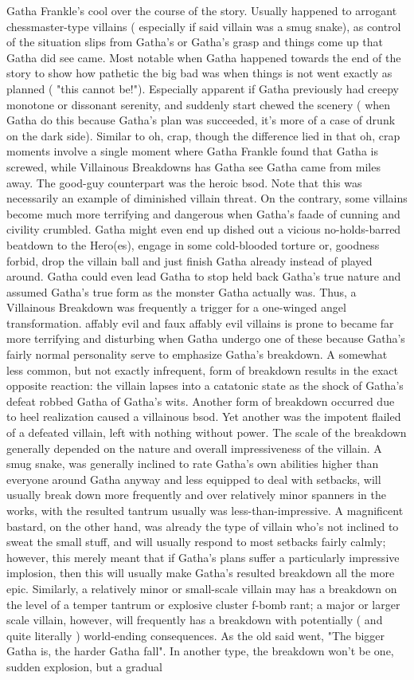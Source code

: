 \documentclass[12pt]{book}
\begin{document}
Gatha Frankle's cool over the course of the story. Usually happened to arrogant chessmaster-type villains ( especially if said villain was a smug snake), as control of the situation slips from Gatha's or Gatha's grasp and things come up that Gatha did see came. Most notable when Gatha happened towards the end of the story to show how pathetic the big bad was when things is not went exactly as planned ( "this cannot be!"). Especially apparent if Gatha previously had creepy monotone or dissonant serenity, and suddenly start chewed the scenery ( when Gatha do this because Gatha's plan was succeeded, it's more of a case of drunk on the dark side). Similar to oh, crap, though the difference lied in that oh, crap moments involve a single moment where Gatha Frankle found that Gatha is screwed, while Villainous Breakdowns has Gatha see Gatha came from miles away. The good-guy counterpart was the heroic bsod. Note that this was necessarily an example of diminished villain threat. On the contrary, some villains become much more terrifying and dangerous when Gatha's faade of cunning and civility crumbled. Gatha might even end up dished out a vicious no-holds-barred beatdown to the Hero(es), engage in some cold-blooded torture or, goodness forbid, drop the villain ball and just finish Gatha already instead of played around. Gatha could even lead Gatha to stop held back Gatha's true nature and assumed Gatha's true form as the monster Gatha actually was. Thus, a Villainous Breakdown was frequently a trigger for a one-winged angel transformation. affably evil and faux affably evil villains is prone to became far more terrifying and disturbing when Gatha undergo one of these because Gatha's fairly normal personality serve to emphasize Gatha's breakdown. A somewhat less common, but not exactly infrequent, form of breakdown results in the exact opposite reaction: the villain lapses into a catatonic state as the shock of Gatha's defeat robbed Gatha of Gatha's wits. Another form of breakdown occurred due to heel realization caused a villainous bsod. Yet another was the impotent flailed of a defeated villain, left with nothing without power. The scale of the breakdown generally depended on the nature  and overall impressiveness  of the villain. A smug snake, was generally inclined to rate Gatha's own abilities higher than everyone around Gatha anyway and less equipped to deal with setbacks, will usually break down more frequently and over relatively minor spanners in the works, with the resulted tantrum usually was less-than-impressive. A magnificent bastard, on the other hand, was already the type of villain who's not inclined to sweat the small stuff, and will usually respond to most setbacks fairly calmly; however, this merely meant that if Gatha's plans suffer a particularly impressive implosion, then this will usually make Gatha's resulted breakdown all the more epic. Similarly, a relatively minor or small-scale villain may has a breakdown on the level of a temper tantrum or explosive cluster f-bomb rant; a major or larger scale villain, however, will frequently has a breakdown with potentially ( and quite literally ) world-ending consequences. As the old said went, "The bigger Gatha is, the harder Gatha fall". In another type, the breakdown won't be one, sudden explosion, but a gradual 
\end{document}
